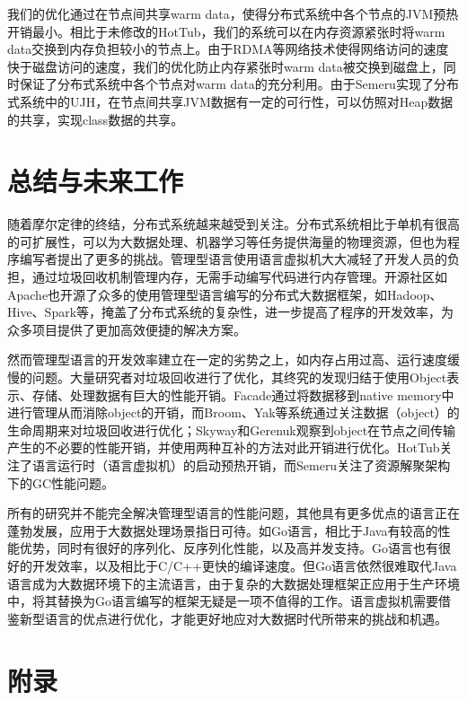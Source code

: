 \documentclass[lang=cn,12pt,a4paper,cite=authoryear]{elegantpaper}
\begin{document}
\begin{figure*}[!htp]
\begin{figure*}[!htp]
\begin{figure*}[!htp]
我们的优化通过在节点间共享warm data，使得分布式系统中各个节点的JVM预热开销最小。相比于未修改的HotTub，我们的系统可以在内存资源紧张时将warm data交换到内存负担较小的节点上。由于RDMA等网络技术使得网络访问的速度快于磁盘访问的速度，我们的优化防止内存紧张时warm data被交换到磁盘上，同时保证了分布式系统中各个节点对warm data的充分利用。由于Semeru实现了分布式系统中的UJH，在节点间共享JVM数据有一定的可行性，可以仿照对Heap数据的共享，实现class数据的共享。

\section{总结与未来工作}

随着摩尔定律的终结，分布式系统越来越受到关注。分布式系统相比于单机有很高的可扩展性，可以为大数据处理、机器学习等任务提供海量的物理资源，但也为程序编写者提出了更多的挑战。管理型语言使用语言虚拟机大大减轻了开发人员的负担，通过垃圾回收机制管理内存，无需手动编写代码进行内存管理。开源社区如Apache也开源了众多的使用管理型语言编写的分布式大数据框架，如Hadoop、Hive、Spark等，掩盖了分布式系统的复杂性，进一步提高了程序的开发效率，为众多项目提供了更加高效便捷的解决方案。

然而管理型语言的开发效率建立在一定的劣势之上，如内存占用过高、运行速度缓慢的问题。大量研究者对垃圾回收进行了优化，其终究的发现归结于使用Object表示、存储、处理数据有巨大的性能开销。Facade通过将数据移到native memory中进行管理从而消除object的开销，而Broom、Yak等系统通过关注数据（object）的生命周期来对垃圾回收进行优化；Skyway和Gerenuk观察到object在节点之间传输产生的不必要的性能开销，并使用两种互补的方法对此开销进行优化。HotTub关注了语言运行时（语言虚拟机）的启动预热开销，而Semeru关注了资源解聚架构下的GC性能问题。

所有的研究并不能完全解决管理型语言的性能问题，其他具有更多优点的语言正在蓬勃发展，应用于大数据处理场景指日可待。如Go语言，相比于Java有较高的性能优势，同时有很好的序列化、反序列化性能，以及高并发支持。Go语言也有很好的开发效率，以及相比于C/C++更快的编译速度。但Go语言依然很难取代Java语言成为大数据环境下的主流语言，由于复杂的大数据处理框架正应用于生产环境中，将其替换为Go语言编写的框架无疑是一项不值得的工作。语言虚拟机需要借鉴新型语言的优点进行优化，才能更好地应对大数据时代所带来的挑战和机遇。

\nocite{*}
\cleardoublepage


\cleardoublepage
\appendix
\addappheadtotoc
\section{附录}


\end{figure*}
\end{figure*}
\end{figure*}
\end{document}

